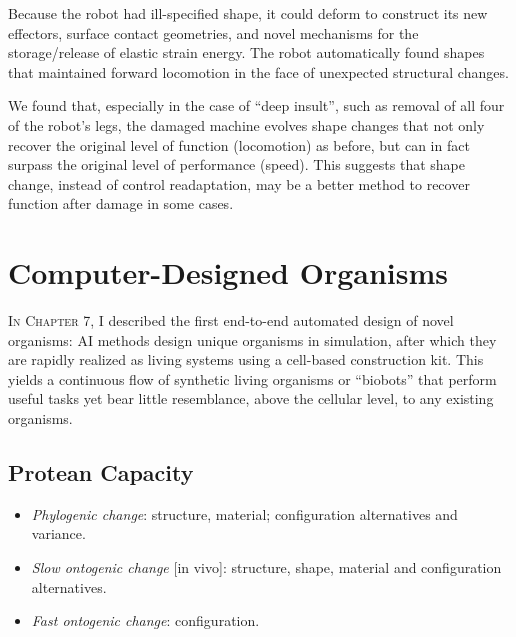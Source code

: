 Because the robot had ill-specified shape,
it could deform to construct its new effectors, surface contact geometries, and novel mechanisms for the storage/release of elastic strain energy.
The robot automatically found shapes that maintained forward locomotion in the face of unexpected structural changes.

We found that, especially in the case of ``deep insult'', such as removal of all four of the robot's legs, the damaged machine evolves shape changes that not only recover the original level of function (locomotion) as before, but can in fact surpass the original level of performance (speed).
This suggests that shape change, instead of control readaptation, may be a better method to recover function after damage in some cases.






\section{Computer-Designed Organisms}


\textsc{In Chapter 7,}
I described the first end-to-end automated design of novel organisms: AI methods design unique organisms in simulation, after which they are rapidly realized as living systems using a cell-based construction kit. 
This yields a continuous flow of synthetic living organisms or ``biobots'' that perform useful tasks yet bear little resemblance, above the cellular level, to any existing organisms. 



\subsection{Protean Capacity}

\begin{itemize}
    \item \textit{Phylogenic change}: structure, material; configuration alternatives and variance.
    \item \textit{Slow ontogenic change} [in vivo]: structure, shape, material and configuration alternatives.
    \item \textit{Fast ontogenic change}: configuration.
\end{itemize}


